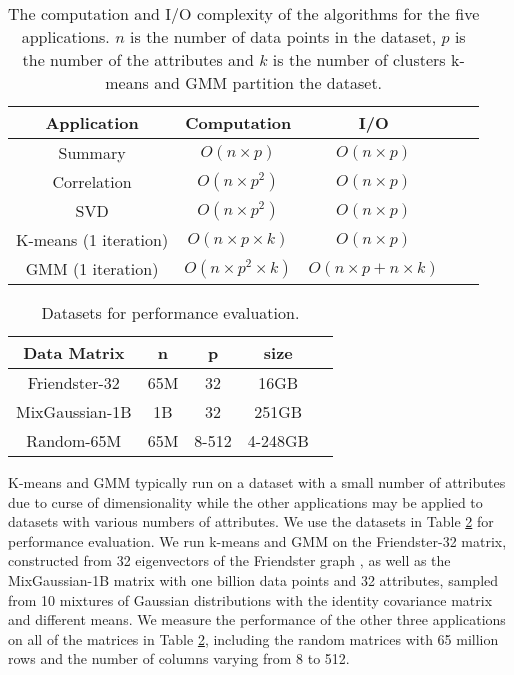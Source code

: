 \begin{table}
\begin{center}
\footnotesize
\begin{tabular}{|c|c|c|c|c|}
\hline
Application & Computation & I/O \\
\hline
Summary & $O(n \times p)$ & $O(n \times p)$ \\
\hline
Correlation & $O(n \times p^2)$ & $O(n \times p)$ \\
\hline
SVD & $O(n \times p^2)$ & $O(n \times p)$ \\
\hline
K-means (1 iteration) & $O(n \times p \times k)$ & $O(n \times p)$ \\
\hline
GMM (1 iteration) & $O(n \times p^2 \times k)$ & $O(n \times p + n \times k)$ \\
\hline
\end{tabular}
\normalsize
\end{center}
\caption{The computation and I/O complexity of the algorithms for the five
	applications. $n$ is the number of data points in the dataset, $p$ is
	the number of the attributes and $k$ is the number of clusters k-means and
GMM partition the dataset.}
\label{tbl:algs}
\end{table}

\begin{table}
\begin{center}
\footnotesize
\begin{tabular}{|c|c|c|c|c|}
\hline
Data Matrix & n & p & size \\
\hline
Friendster-32 \cite{friendster} & 65M & 32 & 16GB \\
\hline
MixGaussian-1B & 1B & 32 & 251GB \\
\hline
Random-65M & 65M & 8-512 & 4-248GB \\
\hline
\end{tabular}
\normalsize
\end{center}
\caption{Datasets for performance evaluation.}
\label{tbl:data}
\end{table}

K-means and GMM typically run on a dataset with a small number of attributes
due to curse of dimensionality \cite{Jain00} while the other applications may
be applied to datasets with various numbers of attributes. We use the datasets
in Table \ref{tbl:data} for performance evaluation. We run k-means and GMM on
the Friendster-32 matrix, constructed from 32 eigenvectors of the Friendster
graph \cite{friendster}, as well as the MixGaussian-1B matrix with one billion data
points and 32 attributes, sampled from 10 mixtures of Gaussian distributions
with the identity covariance matrix and different means. We measure the performance
of the other three applications on all of the matrices in Table \ref{tbl:data},
including the random matrices with 65 million rows and the number of columns
varying from 8 to 512.

